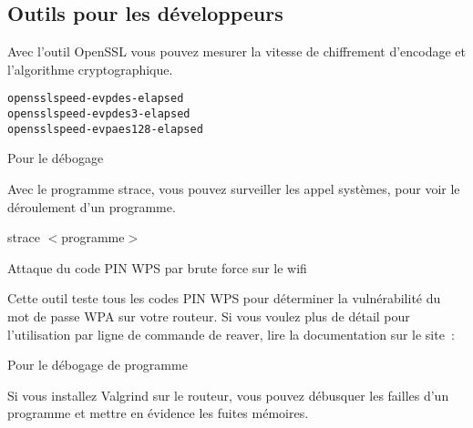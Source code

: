 \subsection {Outils pour les développeurs}

\begin{description}


    Avec l'outil OpenSSL vous pouvez mesurer la vitesse de chiffrement
    d'encodage et l'algorithme cryptographique.

\begin{example}
\begin{alltt}
openssl speed -evp des -elapsed
openssl speed -evp des3 -elapsed
openssl speed -evp aes128 -elapsed
\end{alltt}
\end{example}

 Pour le débogage

    Avec le programme strace, vous pouvez surveiller les appel systèmes, pour
    voir le déroulement d'un programme.

    strace $<$programme$>$

 Attaque du code PIN WPS par brute force sur le wifi

    Cette outil teste tous les codes PIN WPS pour déterminer la vulnérabilité
    du mot de passe WPA sur votre routeur. Si vous voulez plus de
    détail pour l'utilisation par ligne de commande de reaver, lire la
    documentation sur le site~: \\

 Pour le débogage de programme

    Si vous installez Valgrind sur le routeur, vous pouvez débusquer les
    failles d'un programme et mettre en évidence les fuites mémoires.

\end{description}
